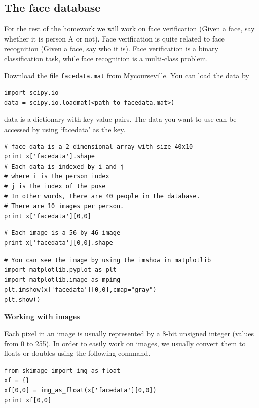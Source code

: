 \documentclass{article}
\begin{document}
\subsection*{The face database}

For the rest of the homework we will work on face verification (Given a face, say whether it is person A or not). Face verification is quite related to face recognition (Given a face, say who it is). Face verification is a binary classification task, while face recognition is a multi-class problem.

Download the file \texttt{facedata.mat} from Mycourseville. You can load the data by

\begin{verbatim}
import scipy.io
data = scipy.io.loadmat(<path to facedata.mat>)
\end{verbatim}

data is a dictionary with key value pairs. The data you want to use can be accessed by using `facedata' as the key.

\begin{verbatim}
# face data is a 2-dimensional array with size 40x10
print x['facedata'].shape
# Each data is indexed by i and j
# where i is the person index
# j is the index of the pose
# In other words, there are 40 people in the database.
# There are 10 images per person.
print x['facedata'][0,0]
\end{verbatim}

\begin{verbatim}
# Each image is a 56 by 46 image
print x['facedata'][0,0].shape
\end{verbatim}

\begin{verbatim}
# You can see the image by using the imshow in matplotlib
import matplotlib.pyplot as plt
import matplotlib.image as mpimg
plt.imshow(x['facedata'][0,0],cmap="gray")
plt.show()
\end{verbatim}

\textbf{Working with images}

Each pixel in an image is usually represented by a 8-bit unsigned integer (values from 0 to 255). In order to easily work on images, we usually convert them to floats or doubles using the following command.

\begin{verbatim}
from skimage import img_as_float
xf = {}
xf[0,0] = img_as_float(x['facedata'][0,0])
print xf[0,0]
\end{verbatim}
\end{document}
